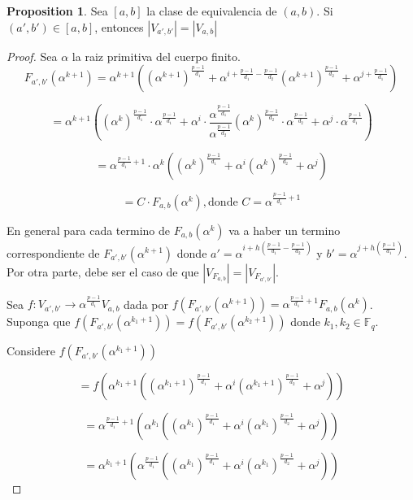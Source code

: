 \documentclass{article}
\theoremstyle{definition}
\newtheorem{prop}[theorem]{Proposition}
\theoremstyle{remark}
\numberwithin{equation}{section}
\begin{document}
\begin{prop}
  
  Sea $[a, b]$ la clase de equivalencia de $(a, b)$. Si $(a', b') \in [a, b]$, entonces 
  $|V_{a', b'}| = |V_{a, b}|$

\end{prop}

\begin{proof}
  
  Sea $\alpha$ la raiz primitiva del cuerpo finito. $$F_{a', b'}(\alpha^{k+1}) = \alpha^{k+1}((\alpha^{k+1})^{\frac{p-1}{d_1}} + \alpha^{i + \frac{p-1}{d_1} - \frac{p-1}{d_2}}(\alpha^{k+1})^{\frac{p-1}{d_2}} + \alpha^{j + \frac{p-1}{d_1}})$$

  $$= \alpha^{k+1}((\alpha^{k})^{\frac{p-1}{d_1}} \cdot \alpha^{\frac{p-1}{d_1}} + \alpha^{i} \cdot \frac{\alpha^{\frac{p-1}{d_1}}} {\alpha^{\frac{p-1}{d_2}}} (\alpha^{k})^{\frac{p-1}{d_2}} \cdot \alpha^{\frac{p-1}{d_2}} + \alpha^{j} \cdot \alpha^{\frac{p-1}{d_1}})$$

  $$= \alpha^{\frac{p-1}{d_1} + 1} \cdot \alpha^{k}((\alpha^{k})^{\frac{p-1}{d_1}} + \alpha^{i}(\alpha^{k})^{\frac{p-1}{d_2}} + \alpha^{j} )$$

  $$= C \cdot F_{a,b}(\alpha^k), \mbox{donde } C = \alpha^{\frac{p-1}{d_1} + 1}$$

  En general para cada termino de $F_{a,b}(\alpha^{k})$ va a haber un termino correspondiente de $F_{a',b'}(\alpha^{k+1})$ donde $a' = \alpha^{i + h(\frac{p-1}{d_1} - \frac{p-1}{d_2})}$ y $b'= \alpha^{j + h(\frac{p-1}{d_1})}$. Por otra parte, debe ser el caso de que $\left\vert V_{F_{a,b}} \right\vert = \left\vert V_{F_{a',b'}} \right\vert$.

  Sea $f:V_{a', b'} \rightarrow \alpha^{\frac{p-1}{d_1}}V_{a, b}$ dada por $f(F_{a', b'}(\alpha^{k+1})) = \alpha^{\frac{p-1}{d_1}+1}F_{a, b}(\alpha^k)$.
  Suponga que $f(F_{a', b'}(\alpha^{k_1+1})) = f(F_{a', b'}(\alpha^{k_2+1}))$ donde $k_1, k_2 \in \mathbb{F}_q$. 

  Considere $f(F_{a', b'}(\alpha^{k_1+1}))$

  $$= f(\alpha^{k_1+1}((\alpha^{k_1+1})^{\frac{p-1}{d_1}} + \alpha^{i}(\alpha^{k_1+1})^{\frac{p-1}{d_2}} + \alpha^{j}))$$ 

  $$= \alpha^{\frac{p-1}{d_1}+1}(\alpha^{k_1}((\alpha^{k_1})^{\frac{p-1}{d_1}} + \alpha^{i}(\alpha^{k_1})^{\frac{p-1}{d_2}} + \alpha^{j}))$$ 

  $$= \alpha^{k_1+1}(\alpha^{\frac{p-1}{d_1}}((\alpha^{k_1})^{\frac{p-1}{d_1}} + \alpha^{i}(\alpha^{k_1})^{\frac{p-1}{d_2}} + \alpha^{j}))$$ 


\end{proof}
\end{document}
